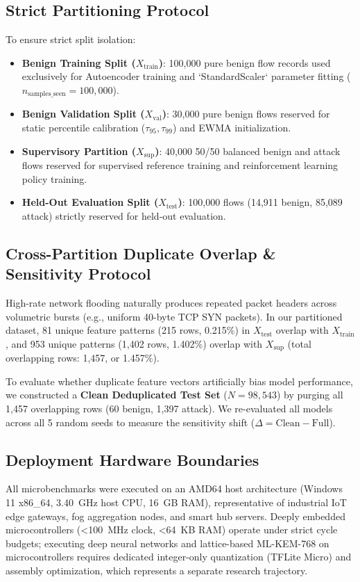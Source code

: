 \documentclass{ieeeaccess}
\begin{document}
\subsection{Strict Partitioning Protocol}
To ensure strict split isolation:
\begin{itemize}
    \item \textbf{Benign Training Split ($X_{\text{train}}$)}: 100,000 pure benign flow records used exclusively for Autoencoder training and `StandardScaler` parameter fitting ($n_{\text{samples\_seen}} = 100,000$).
    \item \textbf{Benign Validation Split ($X_{\text{val}}$)}: 30,000 pure benign flows reserved for static percentile calibration ($\tau_{95}, \tau_{99}$) and EWMA initialization.
    \item \textbf{Supervisory Partition ($X_{\text{sup}}$)}: 40,000 50/50 balanced benign and attack flows reserved for supervised reference training and reinforcement learning policy training.
    \item \textbf{Held-Out Evaluation Split ($X_{\text{test}}$)}: 100,000 flows (14,911 benign, 85,089 attack) strictly reserved for held-out evaluation.
\end{itemize}

\subsection{Cross-Partition Duplicate Overlap & Sensitivity Protocol}
High-rate network flooding naturally produces repeated packet headers across volumetric bursts (e.g., uniform 40-byte TCP SYN packets). In our partitioned dataset, 81 unique feature patterns (215 rows, 0.215\%) in $X_{\text{test}}$ overlap with $X_{\text{train}}$, and 953 unique patterns (1,402 rows, 1.402\%) overlap with $X_{\text{sup}}$ (total overlapping rows: 1,457, or 1.457\%).

To evaluate whether duplicate feature vectors artificially bias model performance, we constructed a \textbf{Clean Deduplicated Test Set} ($N=98,543$) by purging all 1,457 overlapping rows (60 benign, 1,397 attack). We re-evaluated all models across all 5 random seeds to measure the sensitivity shift ($\Delta = \text{Clean} - \text{Full}$).

\subsection{Deployment Hardware Boundaries}
All microbenchmarks were executed on an AMD64 host architecture (Windows 11 x86\_64, 3.40~GHz host CPU, 16~GB RAM), representative of industrial IoT edge gateways, fog aggregation nodes, and smart hub servers. Deeply embedded microcontrollers (<100~MHz clock, <64~KB RAM) operate under strict cycle budgets; executing deep neural networks and lattice-based ML-KEM-768 on microcontrollers requires dedicated integer-only quantization (TFLite Micro) and assembly optimization, which represents a separate research trajectory.
\end{document}
